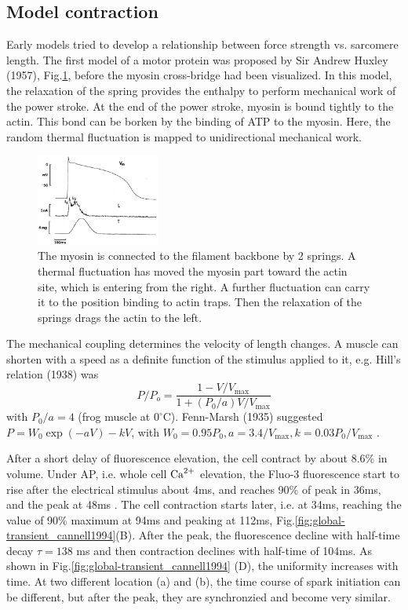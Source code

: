 \subsection{Model contraction}

Early models tried to develop a relationship between force strength vs.
sarcomere length. The first model of a motor protein was proposed by Sir Andrew
Huxley (1957), Fig.\ref{fig:motor_protein_Huxley}, before the myosin
cross-bridge had been visualized. In this model, the relaxation of the spring
provides the enthalpy to perform mechanical work of the power stroke. At the end
of the power stroke, myosin is bound tightly to the actin. This bond can be
borken by the binding of ATP to the myosin. Here, the random thermal fluctuation
is mapped to unidirectional mechanical work.

\begin{figure}[hbt]
  \centerline{\includegraphics[height=3cm]{./images/Purkinjie_Calcium_Wier1982.eps}}
  \caption{The myosin is connected to the filament backbone by 2 springs. A
  thermal fluctuation has moved the myosin part toward the actin site, which is
  entering from the right. A further fluctuation can carry it to the position
  binding to actin traps. Then the relaxation of the springs drags the actin to
  the left.}
  \label{fig:motor_protein_Huxley}
\end{figure}

The mechanical coupling determines the velocity of length
changes. A muscle can shorten with a speed as a definite function of the
stimulus applied to it, e.g. Hill's relation (1938) was
\begin{equation}
P/P_o = \frac{1-V/V_\max}{1+(P_0/a)V/V_\max}
\end{equation}
with $P_0/a = 4$ (frog muscle at $0^\circ$C). Fenn-Marsh (1935) suggested
$P=W_0\exp(-aV)-kV$, with $W_0=0.95P_0, a=3.4/V_\max, k=0.03P_0/V_\max$
\citep{huxley1974}.

After a short delay of fluorescence elevation, the cell contract by about 8.6\%
in volume. Under AP, i.e. whole cell ${\text{Ca}^{2+}}$ elevation, the Fluo-3 fluorescence
start to rise after the electrical stimulus about 4ms, and reaches 90\% of peak
in 36ms, and the peak at 48ms \citep{cannell1994snu}. The cell contraction
starts later, i.e. at 34ms, reaching the value of 90\% maximum at 94ms and
peaking at 112ms, Fig.\ref{fig:global-transient_cannell1994}(B).
After the peak, the fluorescence decline with half-time decay $\tau = 138$ ms
and then contraction declines with half-time of 104ms. As shown in
Fig.\ref{fig:global-transient_cannell1994} (D), the uniformity increases with
time. At two different location (a) and (b), the time course of spark initiation
can be different, but after the peak, they are synchronzied and become very
similar.


